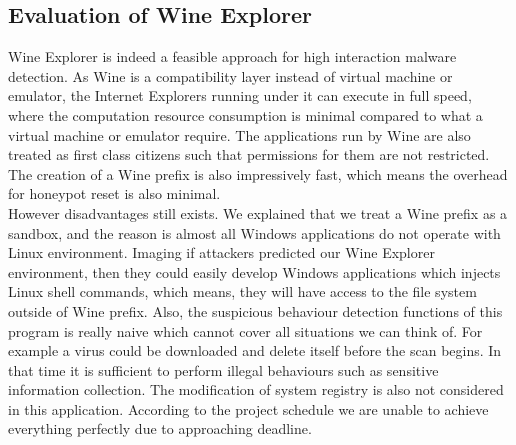 \subsection{Evaluation of Wine Explorer}
Wine Explorer is indeed a feasible approach for high interaction malware 
detection. As Wine is a compatibility layer instead of virtual machine or 
emulator, the Internet Explorers running under it can execute in full speed, 
where the computation resource consumption is minimal compared to what 
a virtual machine or emulator require. The applications run by Wine are also 
treated as first class citizens such that permissions for them are not 
restricted. The creation of a Wine prefix is also impressively fast, which 
means the overhead for honeypot reset is also minimal. \\
However disadvantages still exists. We explained that we treat a Wine prefix 
as a sandbox, and the reason is almost all Windows applications do not operate 
with Linux environment. Imaging if attackers predicted our Wine Explorer 
environment, then they could easily develop Windows applications which injects 
Linux shell commands, which means, they will have access to the file system 
outside of Wine prefix. Also, the suspicious behaviour detection functions of this 
program is really naive which cannot cover all situations we can think of. For 
example a virus could be downloaded and delete itself before the scan begins. 
In that time it is sufficient to perform illegal behaviours such as sensitive 
information collection. The modification of system 
registry is also not considered in this application. According to the project 
schedule we are unable to achieve everything perfectly due to approaching 
deadline. 

